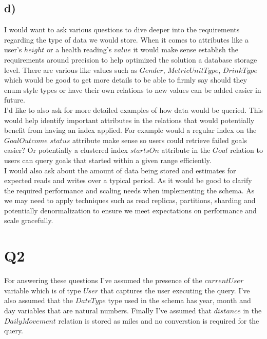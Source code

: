 \documentclass{article}
\begin{document}
\subsection*{\small d)}

I would want to ask various questions to dive deeper into the requirements regarding the type of data we would store. When it comes to attributes like a user’s $height$ or a health reading’s $value$ it would make sense establish the requirements around precision to help optimized the solution a database storage level. There are various like values such as $Gender$, $MetricUnitType$, $DrinkType$ which would be good to get more details to be able to firmly say should they enum style types or have their own relations to new values can be added easier in future. \\
\newline
I'd like to also ask for more detailed examples of how data would be queried. This would help identify important attributes in the relations that would potentially benefit from having an index applied. For example would a regular index on the $GoalOutcome$ $status$ attribute make sense so users could retrieve failed goals easier? Or potentially a clustered index $startsOn$ attribute in the $Goal$ relation to users can query goals that started within a given range efficiently. \\
\newline
I would also ask about the amount of data being stored and estimates for expected reads and writes over a typical period. As it would be good to clarify the required performance and scaling needs when implementing the schema. As we may need to apply techniques such as read replicas, partitions, sharding and potentially denormalization to ensure we meet expectations on performance and scale gracefully.

\pagebreak

\section*{Q2}

For answering these questions I've assumed the presence of the $currentUser$ variable which is of type $User$ that captures the user executing the query. I've also assumed that the $DateType$ type used in the schema has year, month and day variables that are natural numbers. Finally I've assumed that $distance$ in the $DailyMovement$ relation is stored as miles and no converstion is required for the query.
\end{document}
